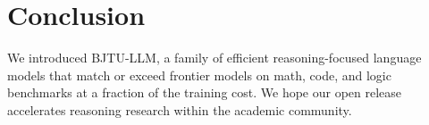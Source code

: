 \section{Conclusion}
\label{sec:conclusion}

We introduced BJTU-LLM, a family of efficient reasoning-focused language
models that match or exceed frontier models on math, code, and logic
benchmarks at a fraction of the training cost. We hope our open release
accelerates reasoning research within the academic community.
